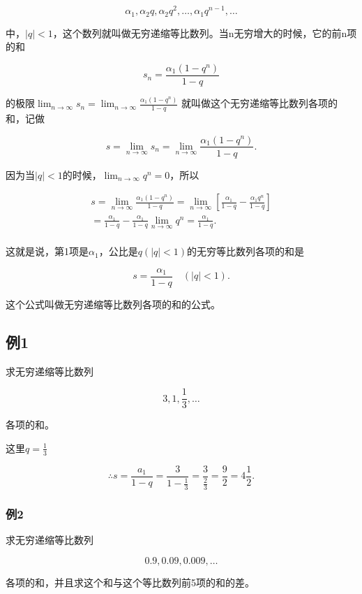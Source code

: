 \[
\alpha_{1}, \alpha_{2} q, \alpha_{2} q^{2}, \dots, \alpha_{1} q^{n - 1}, \dots
\]

中，\(|q|<1\)，这个数列就叫做无穷递缩等比数列。当n无穷增大的时候，它的前n项的和

\[
s_{n} = \frac{\alpha_{1} (1 - q^{n})}{1 - q}
\]

的极限\(\lim_{n\to \infty}s_n = \lim_{n\to \infty}\frac{\alpha_1(1 - q^n)}{1 - q}\)
就叫做这个无穷递缩等比数列各项的和，记做

\[
s = \lim_{n \rightarrow \infty} s_{n} = \lim_{n \rightarrow \infty} \frac{\alpha_{1} (1 - q^{n})}{1 - q}.
\]

因为当\(|q| < 1\)的时候，\(\lim_{n \to \infty} q^n = 0\)，所以

\[
\begin{array}{l} s = \lim_{n \rightarrow \infty} \frac{\alpha_{1} (1 - q^{n})}{1 - q} = \lim_{n \rightarrow \infty} \left[ \frac{\alpha_{1}}{1 - q} - \frac{\alpha_{1} q^{n}}{1 - q} \right] \\ = \frac{\alpha_{1}}{1 - q} - \frac{\alpha_{1}}{1 - q} \lim_{n \rightarrow \infty} q^{n} = \frac{\alpha_{1}}{1 - q}. \\ \end{array}
\]

这就是说，第1项是\(\alpha_{1}\)，公比是\(q(|q| < 1)\)的无穷等比数列各项的和是

\[
s = \frac{\alpha_{1}}{1 - q} \quad (| q | < 1).
\]

这个公式叫做无穷递缩等比数列各项的和的公式。

\subsection{例1}

求无穷递缩等比数列

\[
3, 1, \frac{1}{3}, \dots
\]

各项的和。

 这里\(q = \frac{1}{3}\)

\[
\therefore s = \frac{a_{1}}{1 - q} = \frac{3}{1 - \frac{1}{3}} = \frac{3}{\frac{2}{3}} = \frac{9}{2} = 4 \frac{1}{2}.
\]

\subsubsection{例2}

求无穷递缩等比数列

\[
0.9, 0.09, 0.009, \dots
\]

各项的和，并且求这个和与这个等比数列前5项的和的差。


